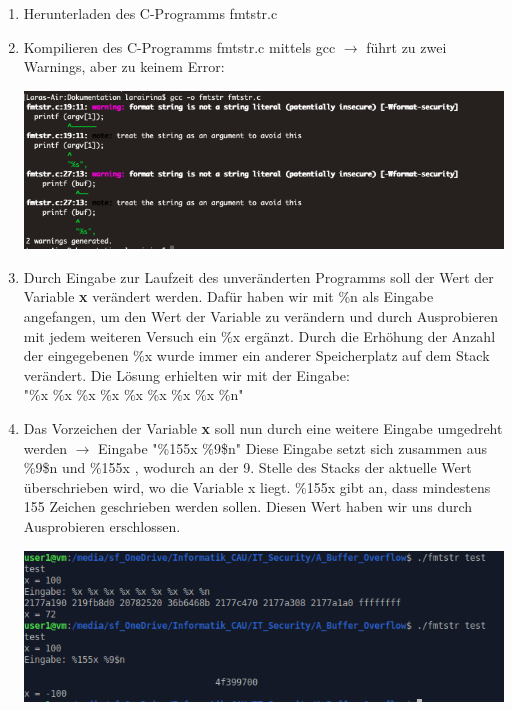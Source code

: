 \documentclass[12pt,a4paper]{article}
\begin{document}
	\begin{enumerate}
		\item Herunterladen des C-Programms fmtstr.c
		\item Kompilieren des C-Programms fmtstr.c mittels gcc $\rightarrow$ führt zu zwei Warnings, aber zu keinem Error:
			\begin{center}
			\includegraphics[scale=0.6]{compilation.png}
			\end{center}
		\item Durch Eingabe zur Laufzeit des unveränderten Programms soll der Wert der Variable \textbf{x} verändert werden. Dafür haben wir mit \%n als Eingabe angefangen, um den Wert der Variable zu verändern und durch Ausprobieren mit jedem weiteren Versuch ein \%x ergänzt. Durch die Erhöhung der Anzahl der eingegebenen \%x wurde immer ein anderer Speicherplatz auf dem Stack verändert. Die Lösung erhielten wir mit der Eingabe: \\
		 "\%x \%x \%x \%x \%x \%x \%x \%x \%n"
		\item Das Vorzeichen der Variable \textbf{x} soll nun durch eine weitere Eingabe umgedreht werden $\rightarrow$ Eingabe "\%155x \%9\$n"
		Diese Eingabe setzt sich zusammen aus \%9\$n und \%155x , wodurch an der 9. Stelle des Stacks der aktuelle Wert überschrieben wird, wo die Variable x liegt. \%155x gibt an, dass mindestens 155 Zeichen geschrieben werden sollen. Diesen Wert haben wir uns durch Ausprobieren erschlossen.
		\begin{center}
		\includegraphics[scale=0.6]{Teil2.png}
		\end{center}
	\end{enumerate}
\end{document}
